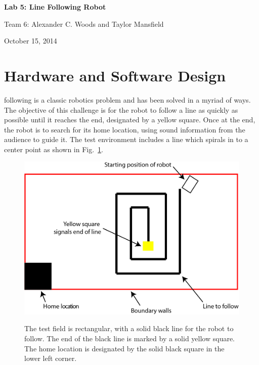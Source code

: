 \documentclass[journal]{IEEEtran}
\begin{document}
\begin{titlepage}
    \vspace*{\fill}
    \begin{center}
      {\LARGE \bf Lab 5: Line Following Robot}

      {Team 6: Alexander  C. Woods and Taylor Mansfield}

      October 15, 2014
    \end{center}
    \vspace*{\fill}
  \end{titlepage}


\section{Hardware and Software Design}\label{S.design}
 following is a classic robotics problem and has been solved in a myriad of ways. The objective of this challenge is for the robot to follow a line as quickly as possible until it reaches the end, designated by a yellow square. Once at the end, the robot is to search for its home location, using sound information from the audience to guide it. The test environment includes a line which spirals in to a center point as shown in Fig.~\ref{F.field}.

\begin{figure}[ht]
 \centering
  \includegraphics[width=1\columnwidth]{field.jpg}\\
  \caption{The test field is rectangular, with a solid black line for the robot to follow. The end of the black line is marked by a solid yellow square. The home location is designated by the solid black square in the lower left corner.}
  \label{F.field}
\end{figure}
\end{document}

